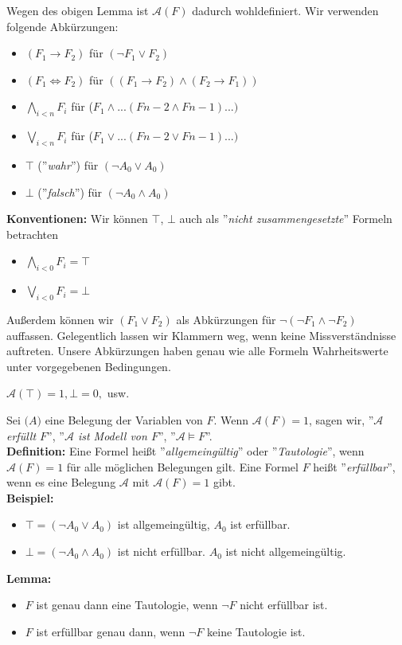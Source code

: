 \documentclass[a4paper]{scrartcl}
\begin{document}
Wegen des obigen Lemma ist $\mathcal{A}(F)$ dadurch wohldefiniert. Wir verwenden folgende Abkürzungen:
\begin{itemize}
\item $(F_1 \rightarrow F_2)$ für $(\neg F_1 \vee F_2)$
\item $(F_1 \Leftrightarrow F_2)$ für $((F_1 \rightarrow F_2) \wedge (F_2 \rightarrow F_1))$
\item $\bigwedge_{i < n}{F_i}$ für ($F_1 \wedge ... (F{n-2} \wedge F{n-1}) ... )$
\item $\bigvee_{i < n}{F_i}$ für ($F_1 \vee ... (F{n-2} \vee F{n-1}) ... )$
\item $\top$ (''\textit{wahr}'') für $(\neg A_0 \vee A_0)$
\item $\bot$ (''\textit{falsch}'') für $(\neg A_0 \wedge A_0)$
\end{itemize}
\textbf{Konventionen:} Wir können $\top$, $\bot$ auch als ''\textit{nicht zusammengesetzte}'' Formeln betrachten
\begin{itemize}
\item $\bigwedge\limits_{i < 0}{F_i} = \top$
\item $\bigvee\limits_{i < 0}{F_i} = \bot$
\end{itemize}
Außerdem können wir $(F_1 \vee F_2)$ als Abkürzungen für $\neg(\neg F_1 \wedge \neg F_2)$ auffassen. Gelegentlich lassen wir Klammern weg, wenn keine Missverständnisse auftreten. Unsere Abkürzungen haben genau wie alle Formeln Wahrheitswerte unter vorgegebenen Bedingungen.\\
\begin{center}
$\mathcal{A}(\top) = 1, \mathcal{\bot} = 0,$ usw.
\end{center}
Sei $\mathcal(A)$ eine Belegung der Variablen von $F$. Wenn $\mathcal{A}(F) = 1$, sagen wir, ''\textit{$\mathcal{A}$ erfüllt $F$}'', ''\textit{$\mathcal{A}$ ist Modell von $F$}'', ''\textit{$\mathcal{A} \models F$}''.\\
\textbf{Definition:} Eine Formel heißt ''\textit{allgemeingültig}'' oder ''\textit{Tautologie}'', wenn $\mathcal{A}(F) = 1$ für alle möglichen Belegungen gilt. Eine Formel $F$ heißt ''\textit{erfüllbar}'', wenn es eine Belegung $\mathcal{A}$ mit $\mathcal{A}(F) = 1$ gibt.\\
\textbf{Beispiel:}
\begin{itemize}
\item $\top = (\neg A_0 \vee A_0)$ ist allgemeingültig, $A_0$ ist erfüllbar.
\item $\bot = (\neg A_0 \wedge A_0)$ ist nicht erfüllbar. $A_0$ ist nicht allgemeingültig.
\end{itemize}
\textbf{Lemma:} 
\begin{itemize}
\item $F$ ist genau dann eine Tautologie, wenn $\neg F$ nicht erfüllbar ist.
\item $F$ ist erfüllbar genau dann, wenn $\neg F$ keine Tautologie ist.
\end{itemize}
\end{document}
